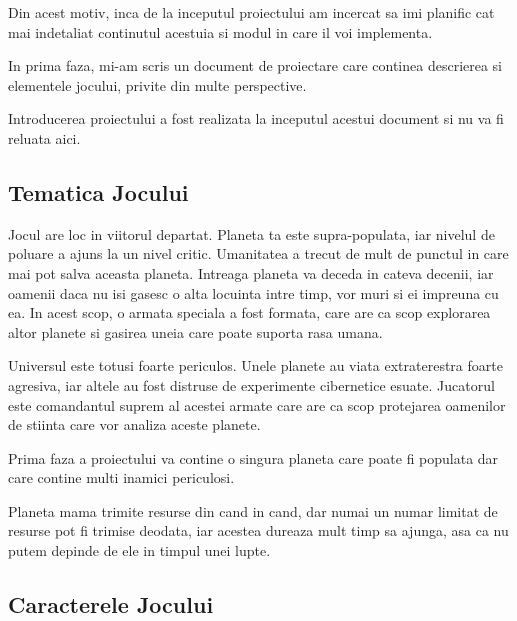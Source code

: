 \documentclass[12pt, a4paper]{article}
\begin{document}
	Din acest motiv, inca de la inceputul proiectului am incercat sa imi planific cat mai indetaliat continutul acestuia si modul in care il voi implementa.
	\newline
	
	In prima faza, mi-am scris un document de proiectare care continea descrierea si elementele jocului, privite din multe perspective.
	\newline
	
	Introducerea proiectului a fost realizata la inceputul acestui document si nu va fi reluata aici.
	
	
	
	
	
	\subsection{Tematica Jocului}
	\label{section: gamePlot}
	
	Jocul are loc in viitorul departat. Planeta ta este supra-populata, iar nivelul de poluare a ajuns la un nivel critic. Umanitatea a trecut de mult de punctul in care mai pot salva aceasta planeta. Intreaga planeta va deceda in cateva decenii, iar oamenii daca nu isi gasesc o alta locuinta intre timp, vor muri si ei impreuna cu ea. In acest scop, o armata speciala a fost formata, care are ca scop explorarea altor planete si gasirea uneia care poate suporta rasa umana.
	\newline
	
	Universul este totusi foarte periculos. Unele planete au viata extraterestra foarte agresiva, iar altele au fost distruse de experimente cibernetice esuate. Jucatorul este comandantul suprem al acestei armate care are ca scop protejarea oamenilor de stiinta care vor analiza aceste planete.
	\newline
	
	Prima faza a proiectului va contine o singura planeta care poate fi populata dar care contine multi inamici periculosi.
	\newline
	
	Planeta mama trimite resurse din cand in cand, dar numai un numar limitat de resurse pot fi trimise deodata, iar acestea dureaza mult timp sa ajunga, asa ca nu putem depinde de ele in timpul unei lupte.
	
	
	
	
	
	\subsection{Caracterele Jocului}
	
\end{document}
